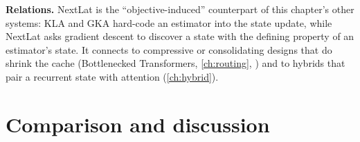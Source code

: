 \textbf{Relations.} NextLat is the ``objective-induced'' counterpart of this chapter's other systems:
KLA and GKA hard-code an estimator into the state update, while NextLat asks gradient descent to
discover a state with the defining property of an estimator's state. It connects to compressive or
consolidating designs that do shrink the cache (Bottlenecked Transformers, \cref{ch:routing},
\citep{oomerjee2026bottlenecked}) and to hybrids that pair a recurrent state with attention
(\cref{ch:hybrid}).

\section{Comparison and discussion}\label{sec:c08-comparison}

